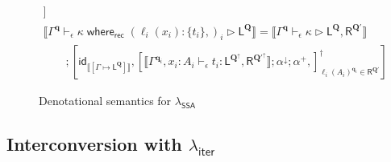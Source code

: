 \documentclass[acmsmall,screen,review]{acmart}
\newcommand{\mc}[1]{\ensuremath{\mathcal{#1}}}
\newcommand{\mb}[1]{\ensuremath{\mathbf{#1}}}
\newcommand{\ms}[1]{\ensuremath{\mathsf{#1}}}
\newcommand{\lto}{:}
\newcommand{\cwhere}[2]{#1\;\ms{where}_{\ms{rec}}\;#2}
\newcommand{\wbranch}[3]{#1(#2) \lto \{#3\}}
\newcommand{\hasty}[4]{#1 \vdash_{#2} #3: {#4}}
\newcommand{\haslb}[4]{#1 \vdash_{#2} #3 \rhd #4}
\newcommand{\tref}{\twoheadrightarrow}
\newcommand{\lbref}[5]{#1 \vdash_{#2} #3 \tref #4 \rhd {#5}}
\newcommand{\ltoty}[2]{[#1 \mapsto #2]}
\newcommand{\dnt}[1]{\llbracket{#1}\rrbracket}
\newcommand{\subiterexp}{\texorpdfstring{\(\lambda_{\ms{iter}}\)}{lambda-iter}}
\newcommand{\isotopessa}{\(\lambda_{\ms{SSA}}\)}
\newcommand{\zeroqv}[1]{#1^\uparrow}
\begin{document}
\begin{figure}
\begin{gather*}
    ]
    \\
    \dnt
    {\haslb{\Gamma^{\mb{q}}}{\epsilon}{\cwhere{\kappa}{(\wbranch{\ell_i}{x_i}{t_i},)_i}}
      {\ms{L}^{\mb{Q}}}}
    = \dnt{\haslb{\Gamma^{\mb{q}}}{\epsilon}{\kappa}
      {\ms{L}^{\mb{Q}}, \ms{R}^{\mb{Q}'}}}
    \\
    \qquad ; [
      \ms{id}_{\dnt{\ltoty{\Gamma}{\ms{L}^{\mb{Q}}}}},
      [
        \dnt{\hasty{\Gamma^{\mb{q}_i}, x_i : A_i}{\epsilon}{t_i}
          {\ms{L}^{\zeroqv{\mb{Q}}}, \ms{R}^{\zeroqv{\mb{Q}'}}}} ; \alpha^\downarrow ; \alpha^+,
      ]_{\ell_i(A_i)^{\mb{q}_i} \in \ms{R}^{\mb{Q}'}}^\dagger
    ]
  \end{gather*}
  \caption{Denotational semantics for \isotopessa{}}
  \Description{}
  \label{fig:ssa-densem}
\end{figure}

\subsection{Interconversion with \subiterexp{}}

\end{document}
